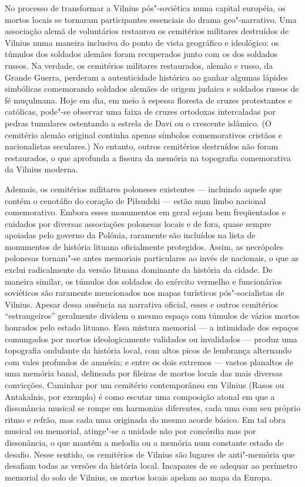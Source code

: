 No processo de transformar a Vilnius pós"-soviética numa capital
européia, os mortos locais se tornaram participantes essenciais do drama
geo"-narrativo. Uma associação alemã de voluntários restaurou os
cemitérios militares destruídos de Vilnius numa maneira inclusiva do
ponto de vista geográfico e ideológico: os túmulos dos soldados alemães
foram recuperados junto com os dos soldados russos. Na verdade, os
cemitérios militares restaurados, alemão e russo, da Grande Guerra,
perderam a autenticidade histórica ao ganhar algumas lápides simbólicas
comemorando soldados alemães de origem judaica e soldados russos de fé
muçulmana. Hoje em dia, em meio à espessa floresta de cruzes
protestantes e católicas, pode"-se observar uma faixa de cruzes ortodoxas
intercaladas por pedras tumulares ostentando a estrela de Davi ou o
crescente islâmico. (O cemitério alemão original continha apenas
símbolos comemorativos cristãos e nacionalistas seculares.) No entanto,
outros cemitérios destruídos não foram restaurados, o que aprofunda a
fissura da memória na topografia comemorativa da Vilnius moderna.

Ademais, os cemitérios militares poloneses existentes --- incluindo aquele
que contém o cenotáfio do coração de Piłsudski --- estão num limbo
nacional comemorativo. Embora esses monumentos em geral sejam bem
freqüentados e cuidados por diversas associações polonesas locais e de
fora, quase sempre apoiadas pelo governo da Polônia, raramente são
incluídos na lista de monumentos de história lituana oficialmente
protegidos. Assim, as necrópoles polonesas tornam"-se antes memoriais
particulares ao invés de nacionais, o que as exclui radicalmente da
versão lituana dominante da história da cidade. De maneira similar, os
túmulos dos soldados do exército vermelho e funcionários soviéticos são
raramente mencionados nos mapas turísticos pós"-socialistas de Vilnius.
Apesar dessa ausência na narrativa oficial, esses e outros cemitérios
``estrangeiros'' geralmente dividem o mesmo espaço com túmulos de vários
mortos honrados pelo estado lituano. Essa mistura memorial --- a
intimidade dos espaços comungados por mortos ideologicamente validados
ou invalidados --- produz uma topografia ondulante da história local, com
altos picos de lembrança alternando com vales profundos de amnésia; e
entre os dois extremos --- vastos planaltos de uma memória banal,
delineada por fileiras de mortos locais das mais diversas convicções.
Caminhar por um cemitério contemporâneo em Vilnius (Rasos ou Antakalnis,
por exemplo) é como escutar uma composição atonal em que a dissonância
musical se rompe em harmonias diferentes, cada uma com seu próprio ritmo
e refrão, mas cada uma originada do mesmo acorde básico. Em tal obra
musical ou memorial, atinge"-se a unidade não por concórdia mas por
dissonância, o que mantém a melodia ou a memória num constante estado de
desafio. Nesse sentido, os cemitérios de Vilnius são lugares de
anti"-memória que desafiam todas as versões da história local. Incapazes
de se adequar ao perímetro memorial do solo de Vilnius, os mortos locais
apelam ao mapa da Europa.

